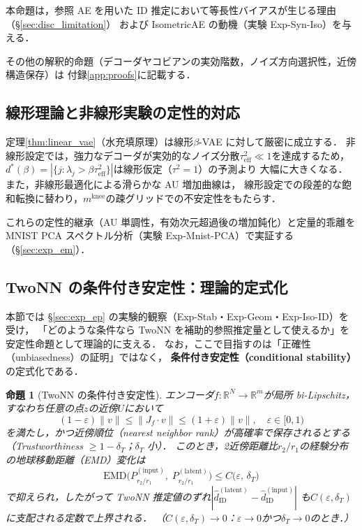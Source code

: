 \documentclass[11pt,a4paper]{jsarticle}
\newtheorem{proposition}{命題}
\newcommand{\R}{\mathbb{R}}
\newcommand{\mknee}{m^{\mathrm{knee}}}
\begin{document}
本命題は，参照 AE を用いた ID 推定において等長性バイアスが生じる理由（§\ref{sec:disc_limitation}）
および IsometricAE の動機（実験 Exp-Syn-Iso）を与える．

その他の解釈的命題（デコーダヤコビアンの実効階数，ノイズ方向選択性，近傍構造保存）は
付録\ref{app:proofs}に記載する．

\subsection{線形理論と非線形実験の定性的対応}\label{sec:theory_bridge}

定理\ref{thm:linear_vae}（水充填原理）は線形$\beta$-VAE に対して厳密に成立する．
非線形設定では，強力なデコーダが実効的なノイズ分散$\tau^2_\mathrm{eff} \ll 1$を達成するため，
$d^*(\beta) = |\{j : \lambda_j > \beta\tau^2_\mathrm{eff}\}|$は線形仮定（$\tau^2=1$）の予測より
大幅に大きくなる．また，非線形最適化による滑らかな AU 増加曲線は，
線形設定での段差的な飽和転換に替わり，$\mknee$の疎グリッドでの不安定性をもたらす．

これらの定性的継承（AU 単調性，有効次元超過後の増加鈍化）と定量的乖離を
MNIST PCA スペクトル分析（実験 Exp-Mnist-PCA）で実証する（§\ref{sec:exp_em}）．

\subsection{TwoNN の条件付き安定性：理論的定式化}\label{sec:theory_stability}

本節では §\ref{sec:exp_ep} の実験的観察（Exp-Stab・Exp-Geom・Exp-Iso-ID）を受け，
「どのような条件なら TwoNN を補助的参照推定量として使えるか」を
安定性命題として理論的に支える．
なお，ここで目指すのは「正確性（unbiasedness）の証明」ではなく，
\textbf{条件付き安定性（conditional stability）}の定式化である．

\begin{proposition}[TwoNN の条件付き安定性]\label{thm:twonn_stability}
エンコーダ$f: \R^N \to \R^m$が局所 bi-Lipschitz，
すなわち任意の点$z$の近傍$U$において
\begin{equation}
  (1-\varepsilon)\|v\| \leq \|J_f \cdot v\| \leq (1+\varepsilon)\|v\|,
  \quad \varepsilon \in [0,1)
  \label{eq:bilip}
\end{equation}
を満たし，かつ近傍順位（nearest neighbor rank）が高確率で保存されるとする
（Trustworthiness $\geq 1 - \delta_T$；$\delta_T$ 小）．
このとき，2近傍距離比$r_2/r_1$の経験分布の地球移動距離（EMD）変化は
\begin{equation}
  \mathrm{EMD}\bigl(P_{r_2/r_1}^{(\mathrm{input})},\; P_{r_2/r_1}^{(\mathrm{latent})}\bigr)
  \leq C\bigl(\varepsilon,\, \delta_T\bigr)
  \label{eq:twonn_stab}
\end{equation}
で抑えられ，したがって TwoNN 推定値のずれ$|\hat{d}_\mathrm{ID}^{(\mathrm{latent})} - \hat{d}_\mathrm{ID}^{(\mathrm{input})}|$
も$C(\varepsilon,\delta_T)$に支配される定数で上界される．
（$C(\varepsilon, \delta_T) \to 0$：$\varepsilon \to 0$かつ$\delta_T \to 0$のとき．）
\end{proposition}
\end{document}
